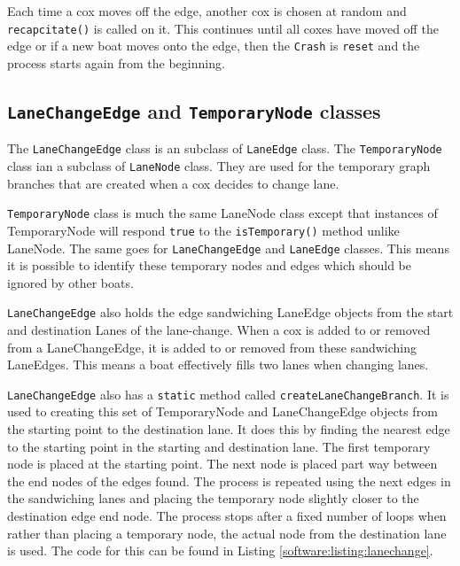 Each time a cox moves off the edge, another cox is chosen at
random and \texttt{recapcitate()} is called on it. This continues
until all coxes have moved off the edge or if a new boat moves onto
the edge, then the \texttt{Crash} is \texttt{reset} and the process starts
again from the beginning.

\subsection{\texttt{LaneChangeEdge} and \texttt{TemporaryNode} classes}\label{software:lane:lanechange}

The \texttt{LaneChangeEdge} class is an subclass of \texttt{LaneEdge} class. The
\texttt{TemporaryNode} class ian a subclass of \texttt{LaneNode} class. They are used
for the temporary graph branches that are created when a cox decides
to change lane.

\texttt{TemporaryNode} class is much the same LaneNode class except that
instances of TemporaryNode will respond \texttt{true} to the
\texttt{isTemporary()} method unlike
LaneNode. The same goes for \texttt{LaneChangeEdge} and \texttt{LaneEdge} classes. This
means it is possible to identify these temporary nodes and edges which
should be ignored by other boats.

\texttt{LaneChangeEdge} also holds the edge sandwiching LaneEdge objects from
the start and destination Lanes of the lane-change. When a cox is
added to or removed from a LaneChangeEdge, it is added to or removed
from these sandwiching LaneEdges. This means a boat effectively fills
two lanes when changing lanes.

\texttt{LaneChangeEdge} also has a \texttt{static} method called \texttt{createLaneChangeBranch}. It is used to creating this
set of TemporaryNode and LaneChangeEdge objects from the starting
point to the destination lane. It does this by finding the nearest
edge to the starting point in the starting and destination lane. The
first temporary node is placed at the starting point. The next node is
placed part way between the end nodes of the edges found. The process
is repeated using the next edges in the sandwiching lanes and placing
the temporary node slightly closer to the destination edge end
node. The process stops after a fixed number of loops when rather than
placing a temporary node, the actual node from the destination lane is
used. The code for this can be found in Listing \ref{software:listing:lanechange}.




